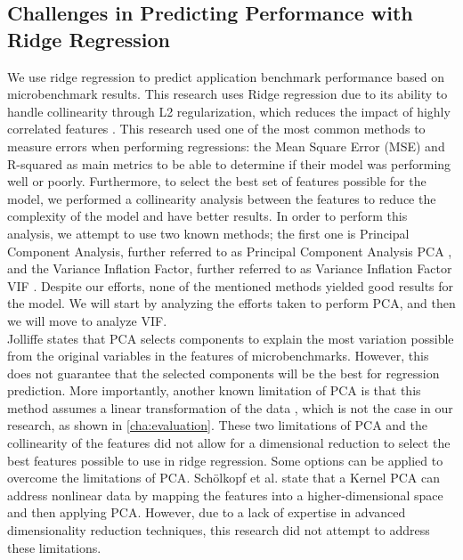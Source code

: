 \subsection{Challenges in Predicting Performance with Ridge Regression}
We use ridge regression to predict application benchmark performance based on microbenchmark results. This research uses Ridge regression due to its ability to handle collinearity through L2 regularization, which reduces the impact of highly correlated features \cite{mcdonald2009ridgeregression}. This research used one of the most common methods to measure errors when performing regressions: the Mean Square Error (\ac{MSE}) \cite{wang2009meansquareerror} and R-squared \cite{chicco2021coefficientofdetermination} as main metrics to be able to determine if their model was performing well or poorly. Furthermore, to select the best set of features possible for the model, we performed a collinearity analysis between the features to reduce the complexity of the model and have better results. In order to perform this analysis, we attempt to use two known methods; the first one is Principal Component Analysis, further referred to as Principal Component Analysis \ac{PCA} \cite{Jolliffe2002PCA}, and the Variance Inflation Factor, further referred to as Variance Inflation Factor \ac{VIF} \cite{thompson2017extractingVIF}. Despite our efforts, none of the mentioned methods yielded good results for the model. We will start by analyzing the efforts taken to perform \ac{PCA}, and then we will move to analyze \ac{VIF}.  \\ 
Jolliffe \cite{Jolliffe2002PCA} states that \ac{PCA} selects components to explain the most variation possible from the original variables in the features of microbenchmarks. However, this does not guarantee that the selected components will be the best for regression prediction. More importantly, another known limitation of \ac{PCA} is that this method assumes a linear transformation of the data \cite{Jolliffe2002PCA}, which is not the case in our research, as shown in \cref{cha:evaluation}. These two limitations of \ac{PCA} and the collinearity of the features did not allow for a dimensional reduction to select the best features possible to use in ridge regression. Some options can be applied to overcome the limitations of \ac{PCA}. Schölkopf et al. \cite{scholkopf1998nonlinearcomponent} state that a Kernel \ac{PCA} can address nonlinear data by mapping the features into a higher-dimensional space and then applying \ac{PCA}. However, due to a lack of expertise in advanced dimensionality reduction techniques, this research did not attempt to address these limitations. \\
